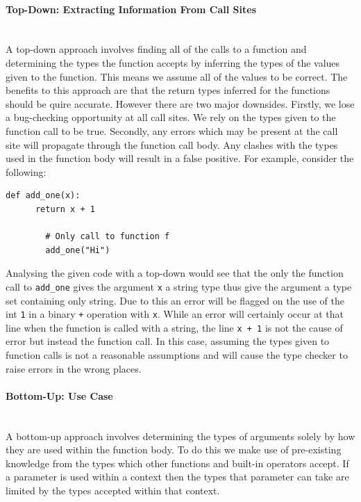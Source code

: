 \documentclass[12pt, titlepage]{article}
\begin{document}
\paragraph{Top-Down: Extracting Information From Call Sites}\mbox{} \\
A top-down approach involves finding all of the calls to a function and determining the types the function accepts by inferring the types of the values given to the function. This means we assume all of the values to be correct. The benefits to this approach are that the return types inferred for the functions should be quire accurate. However there are two major downsides. Firstly, we lose a bug-checking opportunity at all call sites. We rely on the types given to the function call to be true. Secondly, any errors which may be present at the call site will propagate through the function call body. Any clashes with the types used in the function body will result in a false positive. For example, consider the following:
\begin{lstlisting}[mathescape]
    def add_one(x):
      return x + 1    	
    	
    	# Only call to function f
    	add_one("Hi")
\end{lstlisting}
Analysing the given code with a top-down would see that the only the function call to \texttt{add\_one} gives the argument \texttt{x} a string type thus give the argument a type set containing only string. Due to this an error will be flagged on the use of the int \texttt{1} in a binary \texttt{+} operation with \texttt{x}. While an error will certainly occur at that line when the function is called with a string, the line \texttt{x + 1} is not the cause of error but instead the function call. In this case, assuming the types given to function calls is not a reasonable assumptions and will cause the type checker to raise errors in the wrong places.

\paragraph{Bottom-Up: Use Case}\mbox{} \\
A bottom-up approach involves determining the types of arguments solely by how they are used within the function body. To do this we make use of pre-existing knowledge from the types which other functions and built-in operators accept. If a parameter is used within a context then the types that parameter can take are limited by the types accepted within that context. \\
\end{document}
